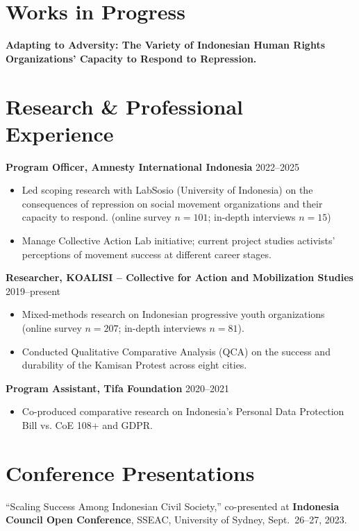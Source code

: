 \documentclass[11pt]{article}
\begin{document}
\section*{Works in Progress}
\textbf{Adapting to Adversity: The Variety of Indonesian Human Rights Organizations’ Capacity to Respond to Repression.}

\section*{Research \& Professional Experience}

\textbf{Program Officer, Amnesty International Indonesia} \hfill 2022--2025
\begin{itemize}
    \item Led scoping research with LabSosio (University of Indonesia) on the consequences of repression on social movement organizations and their capacity to respond. (online survey $n=101$; in-depth interviews $n=15$)
    \item Manage Collective Action Lab initiative; current project studies activists’ perceptions of movement success at different career stages.
\end{itemize}

\textbf{Researcher, KOALISI -- Collective for Action and Mobilization Studies} \hfill 2019--present
\begin{itemize}
    \item Mixed-methods research on Indonesian progressive youth organizations (online survey $n=207$; in-depth interviews $n=81$).
    \item Conducted Qualitative Comparative Analysis (QCA) on the success and durability of the Kamisan Protest across eight cities.
\end{itemize}

\textbf{Program Assistant, Tifa Foundation} \hfill 2020--2021
\begin{itemize}
    \item Co-produced comparative research on Indonesia’s Personal Data Protection Bill vs. CoE 108+ and GDPR.
\end{itemize}

\section*{Conference Presentations}
``Scaling Success Among Indonesian Civil Society,'' co-presented at \textbf{Indonesia Council Open Conference}, SSEAC, University of Sydney, Sept.\ 26--27, 2023.
\end{document}
